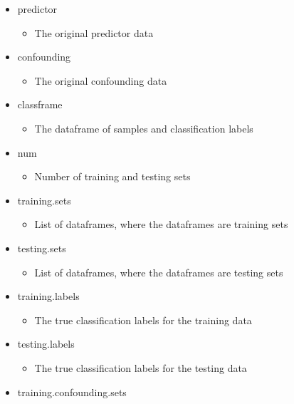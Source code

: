 \documentclass[
]{article}
\providecommand{\tightlist}{%
  \setlength{\itemsep}{0pt}\setlength{\parskip}{0pt}}
\begin{document}
\begin{itemize}
\tightlist
\item
  predictor

  \begin{itemize}
  \tightlist
  \item
    The original predictor data
  \end{itemize}
\item
  confounding

  \begin{itemize}
  \tightlist
  \item
    The original confounding data
  \end{itemize}
\item
  classframe

  \begin{itemize}
  \tightlist
  \item
    The dataframe of samples and classification labels
  \end{itemize}
\item
  num

  \begin{itemize}
  \tightlist
  \item
    Number of training and testing sets
  \end{itemize}
\item
  training.sets

  \begin{itemize}
  \tightlist
  \item
    List of dataframes, where the dataframes are training sets
  \end{itemize}
\item
  testing.sets

  \begin{itemize}
  \tightlist
  \item
    List of dataframes, where the dataframes are testing sets
  \end{itemize}
\item
  training.labels

  \begin{itemize}
  \tightlist
  \item
    The true classification labels for the training data
  \end{itemize}
\item
  testing.labels

  \begin{itemize}
  \tightlist
  \item
    The true classification labels for the testing data
  \end{itemize}
\item
  training.confounding.sets


\end{itemize}
\end{document}
